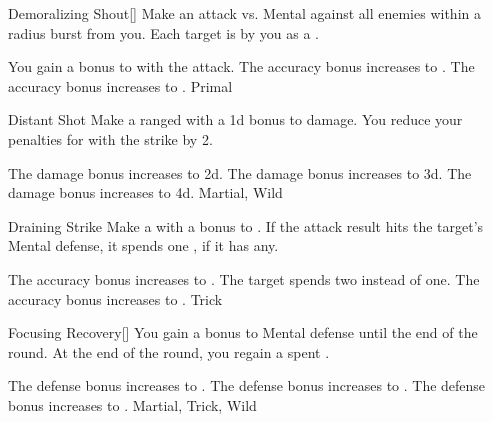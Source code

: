 \lowercase{\hypertarget{maneuver:Demoralizing Shout}{}}\label{maneuver:Demoralizing Shout}
\begin{apability}{\hypertarget{maneuver:Demoralizing Shout}{Demoralizing Shout}}[]
Make an attack vs. Mental against all enemies within a \arealarge radius burst from you.
\hit Each target is  by you as a .

\rankline
{} You gain a  bonus to  with the attack.
 The accuracy bonus increases to .
 The accuracy bonus increases to .
 Primal
\end{apability}
\vspace{0.25em}



\lowercase{\hypertarget{maneuver:Distant Shot}{}}\label{maneuver:Distant Shot}
\begin{apability}{\hypertarget{maneuver:Distant Shot}{Distant Shot}}
Make a ranged  with a \plus1d bonus to damage.
You reduce your penalties for  with the strike by 2.

\rankline
{} The damage bonus increases to \plus2d.
 The damage bonus increases to \plus3d.
 The damage bonus increases to \plus4d.
 Martial, Wild
\end{apability}
\vspace{0.25em}



\lowercase{\hypertarget{maneuver:Draining Strike}{}}\label{maneuver:Draining Strike}
\begin{apability}{\hypertarget{maneuver:Draining Strike}{Draining Strike}}
Make a  with a  bonus to .
If the attack result hits the target's Mental defense,
it spends one , if it has any.

\rankline
{} The accuracy bonus increases to .
 The target spends two  instead of one.
 The accuracy bonus increases to .
 Trick
\end{apability}
\vspace{0.25em}



\lowercase{\hypertarget{maneuver:Focusing Recovery}{}}\label{maneuver:Focusing Recovery}
\begin{freeability}{\hypertarget{maneuver:Focusing Recovery}{Focusing Recovery}}[]
You gain a  bonus to Mental defense until the end of the round.
At the end of the round, you regain a spent .

\rankline
{} The defense bonus increases to .
 The defense bonus increases to .
 The defense bonus increases to .
 Martial, Trick, Wild
\end{freeability}
\vspace{0.25em}



